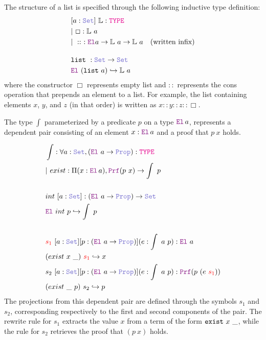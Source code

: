 \begin{definition}[List]\label{def:list}
The structure of a list is specified through the following inductive type definition:
\begin{align*}
&[a: \set]~ \bb{L}: \type \\
&|~\Box : \bb{L}~a \\
&|~\mathrel{::}~: \el  a \ra \bb{L}~a \ra \bb{L}~a \quad \text{(written infix)} \\[1em]
& \kw{list}~: \set \ra \set \\
&  \el~(\kw{list}~a) \re \bb{L}~a
\end{align*}
where the constructor $\Box$ represents empty list and $\mathrel{::}$ represents the cons operation that prepends an element to a list.
For example, the list containing elements $x$, $y$, and $z$ (in that order) is written as $x \mathrel{::} y \mathrel{::} z \mathrel{::} \Box$.
\end{definition}


\begin{definition}\label{dep-pair-def}
The type $\int$ parameterized by a predicate $p$ on a type $\el\,a$, represents a dependent pair consisting of an element $x : \el\,a$ and a proof that $p~x$ holds.

\begin{align*}
&\int : \forall a : \set{}, (\el{}~a \ra \prop): \type \\
&|~exist : \Pi (x :\el{}\,a), \prf (p~x) \ra \int~p \\
&\\
& int~[a: \set{}]: (\el{}~a \ra \prop) \ra \set{} \\
& \el{}~int~p \re \int~p \\
&\\
& \textcolor{red}{s_1}~[a: \set{}] [p:(\el{}~a \ra \prop)] (e: \int~a~p): \el{}~a \\
& (exist~x~\_)~\textcolor{red}{s_1} \re x\\
& s_2~[a: \set{}] [p:(\el{}~a \ra \prop)] (e: \int~a~p): \prf{}(p~(e~\textcolor{red}{s_1})) \\
& (exist~\_~p)~s_2 \re p\\
\end{align*}
The projections from this dependent pair are defined through the symbols $s_1$ and $s_2$, corresponding respectively to the first and second components of the pair.
The rewrite rule for $s_1$ extracts the value $x$ from a term of the form $\texttt{\upshape{exist}}~x~\_$, while the rule for $s_2$ retrieves the proof that $(p~x)$ holds.
\end{definition}

